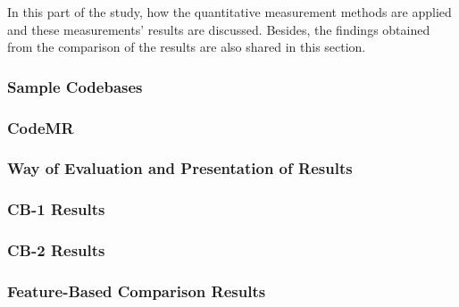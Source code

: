 In this part of the study, how the quantitative measurement methods are applied and these measurements' results are discussed. Besides, the findings obtained from the comparison of the results are also shared in this section.

\subsubsection{Sample Codebases}
\label{section:5.3.1}


\subsubsection{CodeMR}
\label{section:5.3.2}


\subsubsection{Way of Evaluation and Presentation of Results}
\label{section:5.3.3}


\subsubsection{CB-1 Results}
\label{section:5.3.4}


\subsubsection{CB-2 Results}
\label{section:5.3.5}


\subsubsection{Feature-Based Comparison Results}
\label{section:5.3.6}

